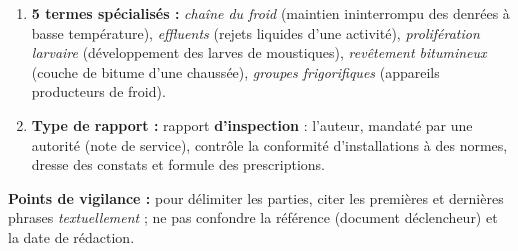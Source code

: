 \documentclass[11pt]{article}
\begin{document}
\begin{corrige}
\begin{enumerate}
\begin{itemize}
\item Vocabulaire précis, sans émotion : aucun jugement de valeur, seulement des constats.
\end{itemize}
\item \textbf{5 termes spécialisés :} \emph{chaîne du froid} (maintien ininterrompu des denrées à basse température), \emph{effluents} (rejets liquides d'une activité), \emph{prolifération larvaire} (développement des larves de moustiques), \emph{revêtement bitumineux} (couche de bitume d'une chaussée), \emph{groupes frigorifiques} (appareils producteurs de froid).
\item \textbf{Type de rapport :} rapport \textbf{d'inspection} : l'auteur, mandaté par une autorité (note de service), contrôle la conformité d'installations à des normes, dresse des constats et formule des prescriptions.
\end{enumerate}
\textbf{Points de vigilance :} pour délimiter les parties, citer les premières et dernières phrases \emph{textuellement} ; ne pas confondre la référence (document déclencheur) et la date de rédaction.
\end{corrige}
\end{document}
